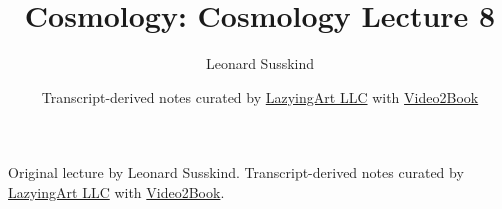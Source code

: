 \documentclass[11pt,oneside]{book}
\begin{document}
\frontmatter
\title{Cosmology: Cosmology Lecture 8}
\author{Leonard Susskind}
\date{Transcript-derived notes curated by \href{https://lazying.art}{LazyingArt LLC} with \href{https://github.com/lachlanchen/Video2Book}{Video2Book}}
\maketitle
\begin{center}
\small Original lecture by Leonard Susskind. Transcript-derived notes curated by \href{https://lazying.art}{LazyingArt LLC} with \href{https://github.com/lachlanchen/Video2Book}{Video2Book}.
\end{center}
\clearpage
\mainmatter

\end{document}
